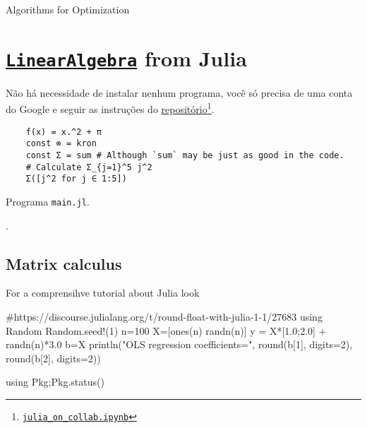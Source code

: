 Algorithms for Optimization

\chapter{\href{https://docs.julialang.org/en/v1/stdlib/LinearAlgebra}{\texttt{LinearAlgebra}} from Julia}

Não há necessidade de instalar nenhum programa, você só precisa de
uma conta do Google e seguir as instruções do \href{https://github.com/Dsantra92/Julia-on-Colab}{repositório}\footnote{\href{https://colab.research.google.com/github/Dsantra92/Julia-on-Colab/blob/master/julia\_on\_collab.ipynb}{\texttt{julia\_on\_collab.ipynb}}}.

\begin{listing}[H]
  \footnotesize
  \begin{verbatim}
    f(x) = x.^2 + π
    const ⊗ = kron
    const Σ = sum # Although `sum` may be just as good in the code.
    # Calculate Σ_{j=1}^5 j^2
    Σ([j^2 for j ∈ 1:5])
    \end{verbatim}
  \caption{Programa \texttt{main.jl}.}
  \label{lst:3.1}
\end{listing}

.
\section{Matrix calculus}


For a comprensihve tutorial about Julia look

\begin{juliacode}
  #https://discourse.julialang.org/t/round-float-with-julia-1-1/27683
  using Random
  Random.seed!(1)
  n=100
  X=[ones(n) randn(n)]
  y = X*[1.0;2.0] + randn(n)*3.0
  b=X\y
  println("OLS regression coefficients=", round(b[1], digits=2), round(b[2], digits=2))
\end{juliacode}

\begin{juliaconsole}
  using Pkg;Pkg.status()
\end{juliaconsole}



